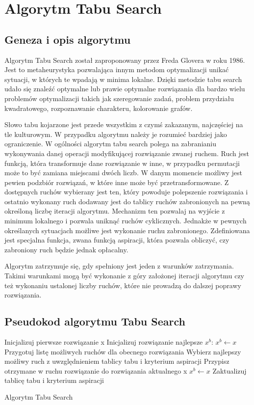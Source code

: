 \section{Algorytm Tabu Search}
\label{sec:TS}
\subsection{Geneza i opis algorytmu}
Algorytm Tabu Search został zaproponowany przez Freda Glovera w roku 1986. Jest to metaheurystyka pozwalająca innym metodom optymalizacji unikać sytuacji, w których te wpadają w minima lokalne. Dzięki metodzie tabu search udało się znaleźć optymalne lub prawie optymalne rozwiązania dla bardzo wielu problemów optymalizacji takich jak szeregowanie zadań, problem przydziału kwadratowego, rozpoznawanie charakteru, kolorowanie grafów.

Słowo tabu kojarzone jest przede wszystkim z czymś zakazanym, najczęściej na tle kulturowym. W przypadku algorytmu należy je rozumieć bardziej jako ograniczenie. W ogólności algorytm tabu search polega na zabranianiu wykonywania danej operacji modyfikującej rozwiązanie zwanej ruchem. Ruch jest funkcją, która transformuje dane rozwiązanie w inne, w przypadku permutacji może to być zamiana miejscami dwóch liczb. W danym momencie możliwy jest pewien podzbiór rozwiązań, w które inne może być przetransformowane. Z dostępnych ruchów wybierany jest ten, który powoduje polepszenie rozwiązania i ostatnio wykonany ruch dodawany jest do tablicy ruchów zabronionych na pewną określoną liczbę iteracji algorytmu. Mechanizm ten pozwalaj na wyjście z minimum lokalnego i pozwala uniknąć ruchów cyklicznych. Jednakże w pewnych określanych sytuacjach możliwe jest wykonanie ruchu zabronionego. Zdefiniowana jest specjalna funkcja, zwana funkcją aspiracji, która pozwala obliczyć, czy zabroniony ruch będzie jednak opłacalny.

Algorytm zatrzymuje się, gdy spełniony jest jeden z warunków zatrzymania. Takimi warunkami mogą być wykonanie z góry założonej iteracji algorytmu czy też wykonaniu ustalonej liczby ruchów, które nie prowadzą do dalszej poprawy rozwiązania.

\subsection{Pseudokod algorytmu Tabu Search}
\begin{algorithm}[H]
	Inicjalizuj pierwsze rozwiązanie x\;
	Inicjalizuj rozwiązanie najlepsze $x^b$: $x^b \leftarrow x$\;
 	{
 		Przygotuj listę możliwych ruchów dla obecnego rozwiązania\;
 		Wybierz najlepszy możliwy ruch z uwzględnieniem tablicy tabu i kryterium aspiracji\;
 		Przypisz otrzymane w ruchu rozwiązanie do rozwiązania aktualnego x\;
 		{
 			$x^b \leftarrow x$
 		} 		
 		Zaktualizuj tablicę tabu i kryterium aspiracji\;		
 	}
 	\caption{Algorytm Tabu Search}
\end{algorithm}

